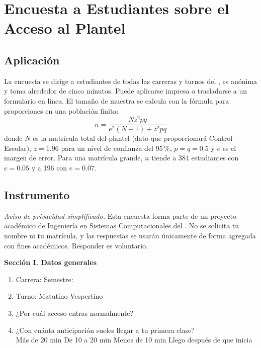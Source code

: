 \section{Encuesta a Estudiantes sobre el Acceso al Plantel}

\subsection{Aplicación}
La encuesta se dirige a estudiantes de todas las carreras y turnos del \tescha{},
es anónima y toma alrededor de cinco minutos. Puede aplicarse impresa o
trasladarse a un formulario en línea. El tamaño de muestra se calcula con la
fórmula para proporciones en una población finita:
\[
	n = \frac{N z^{2} p q}{e^{2}(N-1) + z^{2} p q}
\]
donde $N$ es la matrícula total del plantel (dato que proporcionará Control
Escolar), $z = 1.96$ para un nivel de confianza del 95\,\%, $p = q = 0.5$ y
$e$ es el margen de error. Para una matrícula grande, $n$ tiende a 384
estudiantes con $e = 0.05$ y a 196 con $e = 0.07$.

\subsection{Instrumento}
\noindent\textit{Aviso de privacidad simplificado.} Esta encuesta forma parte de
un proyecto académico de Ingeniería en Sistemas Computacionales del \tescha{}. No
se solicita tu nombre ni tu matrícula, y las respuestas se usarán únicamente de
forma agregada con fines académicos. Responder es voluntario.

\medskip
\noindent\textbf{Sección I. Datos generales}
\begin{enumerate}
	\item Carrera: \linea[6cm] \qquad Semestre: \linea[1.5cm]
	\item Turno: \op Matutino \quad \op Vespertino
	\item ¿Por cuál acceso entras normalmente? \linea[6cm]
	\item ¿Con cuánta anticipación sueles llegar a tu primera clase?\\
	      \op Más de 20 min \quad \op De 10 a 20 min \quad \op Menos de 10 min
	      \quad \op Llego después de que inicia
\end{enumerate}


